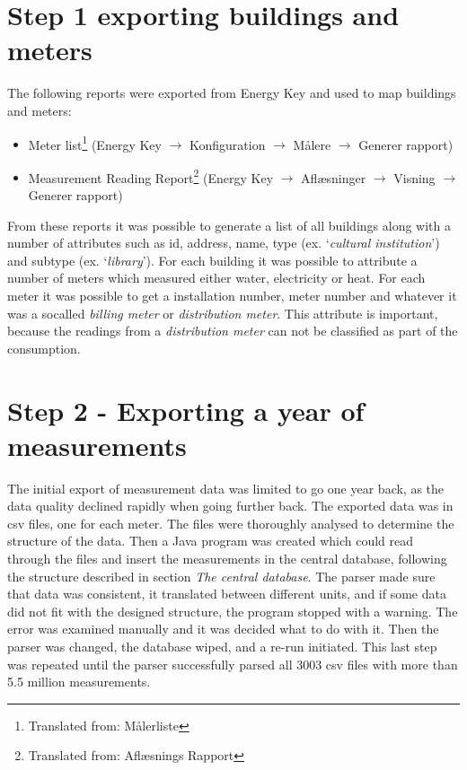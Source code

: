 \section*{Step 1 exporting buildings and meters}
The following reports were exported from Energy Key and used to map buildings and meters:
\begin{itemize}
\item Meter list\footnote{Translated from: Målerliste}  (Energy Key $\rightarrow$ Konfiguration $\rightarrow$ Målere $\rightarrow$ Generer rapport)
\item Measurement Reading Report\footnote{Translated from: Aflæsnings Rapport} (Energy Key $\rightarrow$ Aflæsninger $\rightarrow$ Visning $\rightarrow$ Generer rapport)
\end{itemize}
From these reports it was possible to generate a list of all buildings along with a number of attributes such as id, address, name, type (ex. ‘\emph{cultural institution}’) and subtype (ex. ‘\emph{library}’). For each building it was possible to attribute a number of meters which measured either water, electricity or heat. For each meter it was possible to get a installation number, meter number and whatever it was a socalled \emph{billing meter} or \emph{distribution meter}. This attribute is important, because the readings from a \emph{distribution meter} can not be classified as part of the consumption.
\section*{Step 2 - Exporting a year of measurements}
The initial export of measurement data was limited to go one year back, as the data quality declined rapidly when going further back. The exported data was in csv files, one for each meter. The files were thoroughly analysed to determine the structure of the data. Then a Java program was created which could read through the files and insert the measurements in the central database, following the structure described in section \emph{The central database}. The parser made sure that data was consistent, it translated between different units, and if some data did not fit with the designed structure, the program stopped with a warning. The error was examined manually and it was decided what to do with it. Then the parser was changed, the database wiped, and a re-run initiated. This last step was repeated until the parser successfully parsed all 3003 csv files with more than 5.5 million measurements. 
